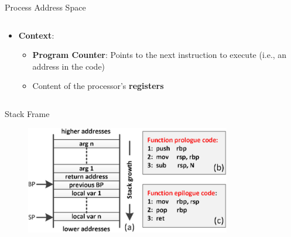 \begin{frame}[fragile]{Process Address Space}
\begin{columns}
\begin{column}{0.7\textwidth}
\begin{itemize}
\begin{itemize}
\begin{itemize}
						            \item \textbf{BSS}: Uninitialized data
						            \item \textbf{Data}: Initialized data
					            \end{itemize}
					      \item<3-> \textbf{Stack}: Function frames, local variables, etc.
					      \item<3-> \textbf{Heap}: Dynamic memory allocation
				      \end{itemize}
				\item<4-> \textbf{Context}:
				      \begin{itemize}
					      \item \textbf{Program Counter}: Points to the next instruction to execute (i.e., an address in the code)
					      \item Content of the processor's \textbf{registers}
				      \end{itemize}
			\end{itemize}
		\end{column}
	\end{columns}
\end{frame}


\begin{frame}[fragile]{Stack Frame}
	\begin{figure}[H]
		\centering
		\includegraphics[width=0.8\textwidth]{day3/img/stack.jpg}
	\end{figure}
\end{frame}


